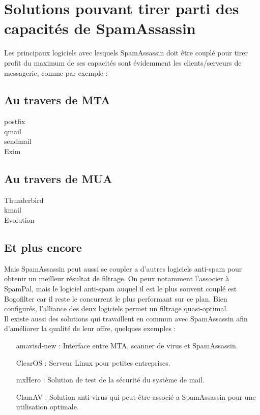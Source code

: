 \documentclass[a4paper,11pt]{article}
\begin{document}
\section{Solutions pouvant tirer parti des capacités de SpamAssassin}
Les principaux logiciels avec lesquels SpamAssassin doit être couplé pour tirer profit du maximum de ses capacités sont évidemment les clients/serveurs de messagerie, comme par exemple :

\subsection{Au travers de MTA}
\begin{description}
\item [postfix]
\item [qmail]
\item [sendmail]
\item [Exim]
\end{description}
\subsection{Au travers de MUA}
\begin{description}
\item [Thunderbird]
\item [kmail]
\item [Evolution]
\end{description}

\subsection{Et plus encore}
Mais SpamAssassin peut aussi se coupler a d'autres logiciels anti-spam pour obtenir un meilleur résultat de filtrage. On peux notamment l'associer à SpamPal, mais le logiciel anti-spam auquel il est le plus souvent couplé est Bogofilter car il reste le concurrent le plus performant sur ce plan. Bien configurés, l'alliance des deux logiciels permet un filtrage quasi-optimal.\\
Il existe aussi des solutions qui travaillent en commun avec SpamAssassin afin d'améliorer la qualité de leur offre, quelques exemples :
\begin{itemize}
\item [amavisd-new] : Interface entre MTA, scanner de virus et SpamAssassin.
\item [ClearOS] : Serveur Linux pour petites entreprises.
\item [mxHero] : Solution de test de la sécurité du système de mail.
\item [ClamAV] : Solution anti-virus qui peut-être associé a SpamAssassin pour une utilisation optimale.
\end{itemize}
\end{document}
